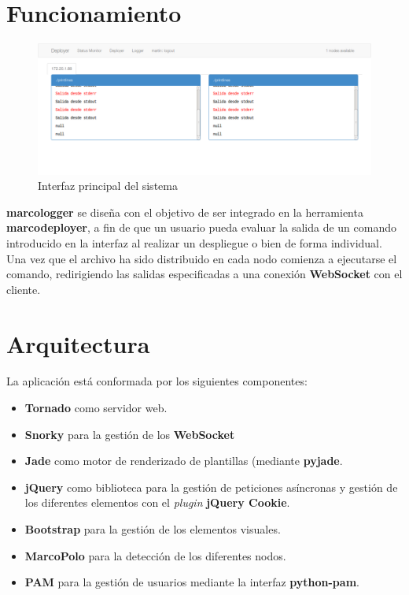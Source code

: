 \documentclass{article}
\begin{document}
\section{Funcionamiento}

\begin{figure}[H]
\includegraphics[width=\textwidth]{Figures/loggermain}
\caption{Interfaz principal del sistema}
\label{logger:main}
\end{figure}

\textbf{marcologger} se diseña con el objetivo de ser integrado en la herramienta \textbf{marcodeployer}, a fin de que un usuario pueda evaluar la salida de un comando introducido en la interfaz al realizar un despliegue o bien de forma individual. Una vez que el archivo ha sido distribuido en cada nodo comienza a ejecutarse el comando, redirigiendo las salidas especificadas a una conexión \textbf{WebSocket} con el cliente.

\section{Arquitectura}

La aplicación está conformada por los siguientes componentes:

\begin{itemize}
	\item \textbf{Tornado} como servidor web.
	\item \textbf{Snorky} para la gestión de los \textbf{WebSocket}
	\item \textbf{Jade} como motor de renderizado de plantillas (mediante \textbf{pyjade}.
	\item \textbf{jQuery} como biblioteca para la gestión de peticiones asíncronas y gestión de los diferentes elementos con el \textit{plugin} \textbf{jQuery Cookie}.
	\item \textbf{Bootstrap} para la gestión de los elementos visuales.
	\item \textbf{MarcoPolo} para la detección de los diferentes nodos.
	\item \textbf{PAM} para la gestión de usuarios mediante la interfaz \textbf{python-pam}.
\end{itemize}
\end{document}
